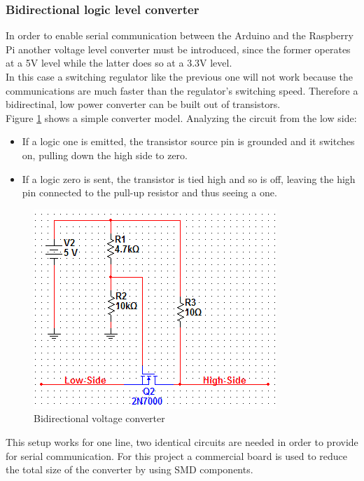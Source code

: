 	\newpage
	\subsubsection{Bidirectional logic level converter}

		In order to enable serial communication between the Arduino and the Raspberry Pi another voltage level converter must be introduced, since the former operates at a 5V level while the latter does so at a 3.3V level.\\

		In this case a switching regulator like the previous one will not work because the communications are much faster than the regulator's switching speed. Therefore a bidirectinal, low power converter can be built out of transistors.\\

		Figure \ref{figure:levelShifter} shows a simple converter model.
		Analyzing the circuit from the low side: 
			\begin{itemize}
			\item If a logic one is emitted, the transistor source pin is grounded and it switches on, pulling down the high side to zero.
			\item If a logic zero is sent, the transistor is tied high and so is off, leaving the high pin connected to the pull-up resistor and thus seeing a one.
			\end{itemize}

			\begin{figure}[H]
					\centering
					\includegraphics[scale=0.8]{images/ProjectComponents/level-converter-circuit.png}
					\caption{Bidirectional voltage converter}
					\label{figure:levelShifter}
			\end{figure}
			\bigskip

			This setup works for one line, two identical circuits are needed in order to provide for serial communication. For this project a commercial board is used to reduce the total size of the converter by using SMD components.

